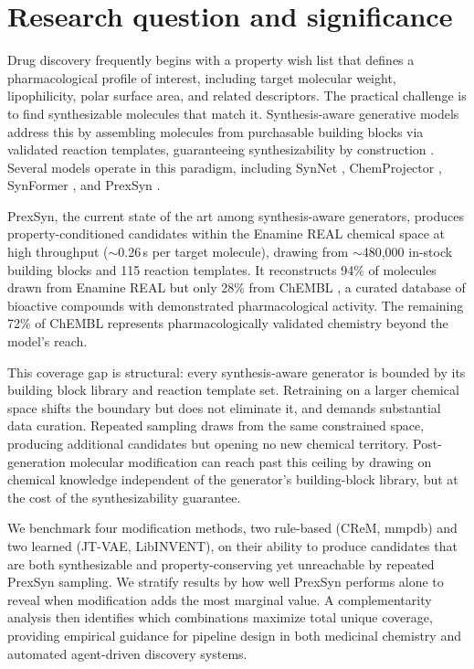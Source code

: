 \section*{Research question and significance}

Drug discovery frequently begins with a property wish list that defines a pharmacological profile of interest, including target molecular weight, lipophilicity, polar surface area, and related descriptors. The practical challenge is to find synthesizable molecules that match it. Synthesis-aware generative models address this by assembling molecules from purchasable building blocks via validated reaction templates, guaranteeing synthesizability by construction \cite{bib1}. Several models operate in this paradigm, including SynNet \cite{bib14}, ChemProjector \cite{bib15}, SynFormer \cite{bib16}, and PrexSyn \cite{bib2}.

PrexSyn, the current state of the art among synthesis-aware generators, produces property-conditioned candidates within the Enamine REAL chemical space \cite{bib3} at high throughput ($\sim$0.26\,s per target molecule), drawing from $\sim$480,000 in-stock building blocks and 115 reaction templates. It reconstructs 94\% of molecules drawn from Enamine REAL but only 28\% from ChEMBL \cite{bib4}, a curated database of bioactive compounds with demonstrated pharmacological activity. The remaining 72\% of ChEMBL represents pharmacologically validated chemistry beyond the model's reach.

This coverage gap is structural: every synthesis-aware generator is bounded by its building block library and reaction template set. Retraining on a larger chemical space shifts the boundary but does not eliminate it, and demands substantial data curation. Repeated sampling draws from the same constrained space, producing additional candidates but opening no new chemical territory. Post-generation molecular modification can reach past this ceiling by drawing on chemical knowledge independent of the generator's building-block library, but at the cost of the synthesizability guarantee.

We benchmark four modification methods, two rule-based (CReM, mmpdb) and two learned (JT-VAE, LibINVENT), on their ability to produce candidates that are both synthesizable and property-conserving yet unreachable by repeated PrexSyn sampling. We stratify results by how well PrexSyn performs alone to reveal when modification adds the most marginal value. A complementarity analysis then identifies which combinations maximize total unique coverage, providing empirical guidance for pipeline design in both medicinal chemistry and automated agent-driven discovery systems.

